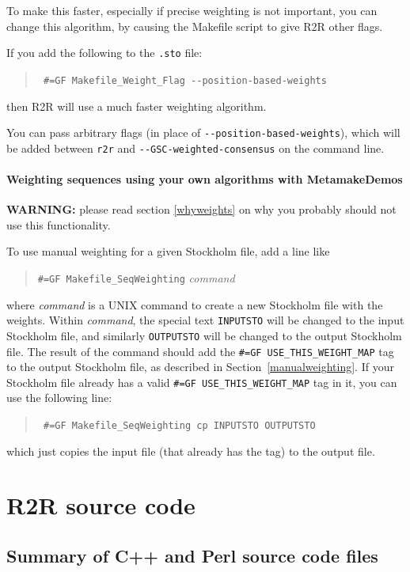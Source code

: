 \documentclass[letterpaper,12pt]{report}
\newcommand{\example}[1]{
\begin{quote}
{\raggedright
#1
}
\end{quote}
}
\newcommand{\examplett}[1]{
\example{{\tt #1}}
}
\begin{document}
To make this faster, especially if precise weighting is not important, you can change this algorithm, by causing the Makefile script to give R2R other flags.

If you add the following to the {\tt .sto} file:
\example{\tt
  \#=GF Makefile\_Weight\_Flag -{}-position-based-weights
}
then R2R will use a much faster weighting algorithm.

You can pass arbitrary flags (in place of {\tt -{}-position-based-weights}), which will be added between {\tt r2r} and {\tt -{}-GSC-weighted-consensus} on the command line.

\subsubsection{Weighting sequences using your own algorithms with MetamakeDemos}
\label{makefilemanualweighting}

{\bf WARNING:} please read section \ref{whyweights} on why you probably should not use this functionality.

To use manual weighting for a given Stockholm file, add a line like
\example{
{\tt \#=GF Makefile\_SeqWeighting} {\it command}
}
where {\it command} is a UNIX command to create a new Stockholm file with the weights.
Within {\it command}, the special text {\tt INPUTSTO} will be changed to the input Stockholm file, and similarly
{\tt OUTPUTSTO} will be changed to the output Stockholm file.
The result of the command should add the {\tt \#=GF USE\_THIS\_WEIGHT\_MAP} tag to the output Stockholm file,
as described in Section~\ref{manualweighting}.
If your Stockholm file already has a valid {\tt \#=GF USE\_THIS\_WEIGHT\_MAP} tag in it, you can use the following line:
\examplett{
\#=GF Makefile\_SeqWeighting cp INPUTSTO OUTPUTSTO
}
which just copies the input file (that already has the tag) to the output file.

\chapter{R2R source code}

\section{Summary of C++ and Perl source code files}
\end{document}
